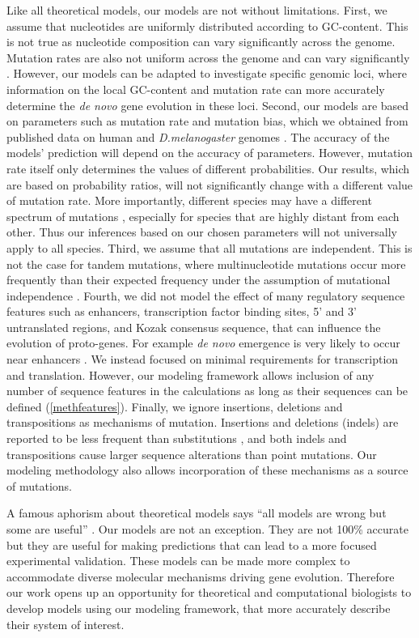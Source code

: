 \documentclass[12pt,a4paper]{article}
\begin{document}
Like all theoretical models, our models are not without limitations. First, we assume that nucleotides are uniformly distributed according to GC-content. This is not true as nucleotide composition can vary significantly across the genome. Mutation rates are also not uniform across the genome and can vary significantly \citep{mutbiasArabidopsis}. However, our models can be adapted to investigate specific genomic loci, where information on the local GC-content and mutation rate can more accurately determine the \textit{de novo} gene evolution in these loci. Second, our models are based on parameters such as mutation rate and mutation bias, which we obtained from published data on human and \textit{D.melanogaster} genomes \citep{humanmutrate,drosophilamutrate}. The accuracy of the models' prediction will depend on the accuracy of parameters. However, mutation rate itself only determines the values of different probabilities. Our results, which are based on probability ratios, will not significantly change with a different value of mutation rate. More importantly, different species may have a different spectrum of mutations \citep{joshmutbias}, especially for species that are highly distant from each other. Thus our inferences based on our chosen parameters will not universally apply to all species. Third, we assume that all mutations are independent. This is not the case for tandem mutations, where multinucleotide mutations occur more frequently than their expected frequency under the assumption of mutational independence \citep{MNM}. Fourth, we did not model the effect of many regulatory sequence features such as enhancers, transcription factor binding sites, 5' and 3' untranslated regions, and Kozak consensus sequence, that can influence the evolution of proto-genes. For example \textit{de novo} emergence is very likely to occur near enhancers \citep{PacoEnhancers}. We instead focused on minimal requirements for transcription and translation. However, our modeling framework allows inclusion of any number of sequence features in the calculations as long as their sequences can be defined (\autoref{methfeatures}). Finally, we ignore insertions, deletions and transpositions as mechanisms of mutation. Insertions and deletions (indels) are reported to be less frequent than substitutions \citep{drosophilamutrate}, and both indels and transpositions cause larger sequence alterations than point mutations. Our modeling methodology also allows incorporation of these mechanisms as a source of mutations. 

A famous aphorism about theoretical models says ``all models are wrong but some are useful'' \citep{GEBox}. Our models are not an exception. They are not 100\% accurate but they are useful for making predictions that can lead to a more focused experimental validation. These models can be made more complex to accommodate diverse molecular mechanisms driving gene evolution. Therefore our work opens up an opportunity for theoretical and computational biologists to develop models using our modeling framework, that more accurately describe their system of interest.
\end{document}
